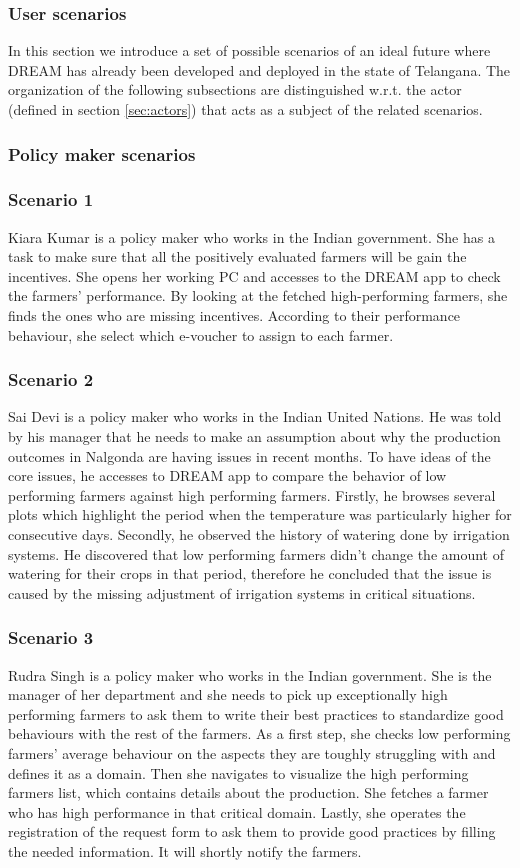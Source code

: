 \subsubsection{User scenarios}
In this section we introduce a set of possible scenarios of an ideal future where DREAM has already been developed and deployed in the state of Telangana. The organization of the following subsections are distinguished w.r.t. the actor (defined in section \ref{sec:actors}) that acts as a subject of the related scenarios.
\subsubsection{Policy maker scenarios}

\subsubsection*{Scenario 1}
Kiara Kumar is a policy maker who works in the Indian government. She has a task to make sure that all the positively evaluated farmers will be gain the incentives. She opens her working PC and accesses to the DREAM app to check the farmers' performance. By looking at the fetched high-performing farmers, she finds the ones who are missing incentives. According to their performance behaviour, she select which e-voucher to assign to each farmer.
\subsubsection*{Scenario 2}
Sai Devi is a policy maker who works in the Indian United Nations. He was told by his manager that he needs to make an assumption about why the production outcomes in Nalgonda are having issues in recent months. To have ideas of the core issues, he accesses to DREAM app to compare the behavior of low performing farmers against high performing farmers. Firstly, he browses several plots which highlight the period when the temperature was particularly higher for consecutive days. Secondly, he observed the history of watering done by irrigation systems. He discovered that low performing farmers didn't change the amount of watering for their crops in that period, therefore he concluded that the issue is caused by the missing adjustment of irrigation systems in critical situations.   
\subsubsection*{Scenario 3}
Rudra Singh is a policy maker who works in the Indian government. She is the manager of her department and she needs to pick up exceptionally high performing farmers to ask them to write their best practices to standardize good behaviours with the rest of the farmers. As a first step, she checks low performing farmers' average behaviour on the aspects they are toughly struggling with and defines it as a domain. Then she navigates to visualize the high performing farmers list, which contains details about the production. She fetches a farmer who has high performance in that critical domain. Lastly, she operates the registration of the request form to ask them to provide good practices by filling the needed information. It will shortly notify the farmers. 
